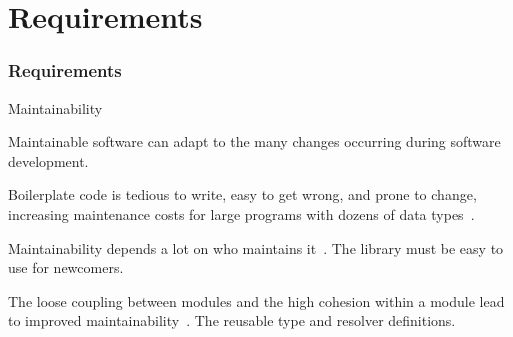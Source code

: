 \section{Requirements}

\begin{frame}\frametitle{Requirements}  

\begin{alertblock}{Maintainability}

Maintainable software can adapt to the many changes occurring during software development.~\cite{requirements-change-1,view-of-web, sof-sus-institute-maintainability}


\begin{itemize}

     Boilerplate code is tedious to write, easy to get wrong, and prone to change, increasing maintenance costs for large programs with dozens of data types~\cite{scrap-your-boilerplate}.

     Maintainability depends a lot on who maintains it~\cite{contr-reduce-maintainability}. The library must be easy to use for newcomers.

    The loose coupling between modules and the high cohesion within a module lead to improved maintainability~\cite{arc-modularity}.
    The reusable type and resolver definitions. 
    
\end{itemize}
\end{alertblock}
\end{frame}

